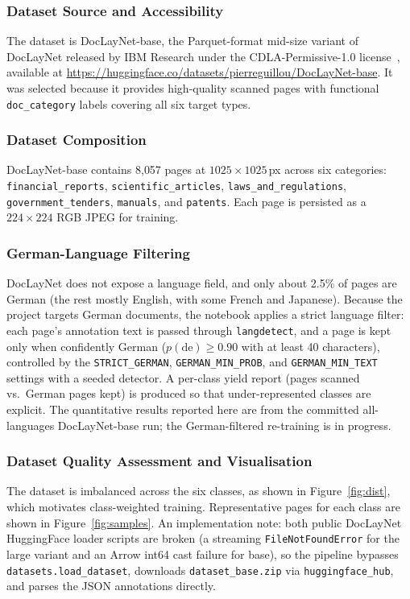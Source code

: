 \documentclass[preprint,12pt]{elsarticle}
\begin{document}
\subsubsection{Dataset Source and Accessibility}
The dataset is DocLayNet-base, the Parquet-format mid-size variant of DocLayNet
released by IBM Research under the CDLA-Permissive-1.0
license~\cite{pfitzmann2022doclaynet}, available at
\url{https://huggingface.co/datasets/pierreguillou/DocLayNet-base}.
It was selected because it provides high-quality scanned pages with functional
\texttt{doc\_category} labels covering all six target types.

\subsubsection{Dataset Composition}
DocLayNet-base contains 8{,}057 pages at $1025\times1025$\,px across six
categories: \texttt{financial\_reports}, \texttt{scientific\_articles},
\texttt{laws\_and\_regulations}, \texttt{government\_tenders}, \texttt{manuals},
and \texttt{patents}.
Each page is persisted as a $224\times224$ RGB JPEG for training.

\subsubsection{German-Language Filtering}
DocLayNet does not expose a language field, and only about 2.5\% of pages are
German (the rest mostly English, with some French and Japanese).
Because the project targets German documents, the notebook applies a strict
language filter: each page's annotation text is passed through
\texttt{langdetect}, and a page is kept only when confidently German
($p(\mathrm{de})\ge0.90$ with at least 40 characters), controlled by the
\texttt{STRICT\_GERMAN}, \texttt{GERMAN\_MIN\_PROB}, and \texttt{GERMAN\_MIN\_TEXT}
settings with a seeded detector.
A per-class yield report (pages scanned vs.\ German pages kept) is produced so
that under-represented classes are explicit.
The quantitative results reported here are from the committed all-languages
DocLayNet-base run; the German-filtered re-training is in progress.

\subsubsection{Dataset Quality Assessment and Visualisation}
The dataset is imbalanced across the six classes, as shown in
Figure~\ref{fig:dist}, which motivates class-weighted training.
Representative pages for each class are shown in Figure~\ref{fig:samples}.
An implementation note: both public DocLayNet HuggingFace loader scripts are
broken (a streaming \texttt{FileNotFoundError} for the large variant and an Arrow
int64 cast failure for base), so the pipeline bypasses
\texttt{datasets.load\_dataset}, downloads \texttt{dataset\_base.zip} via
\texttt{huggingface\_hub}, and parses the JSON annotations directly.
\end{document}
